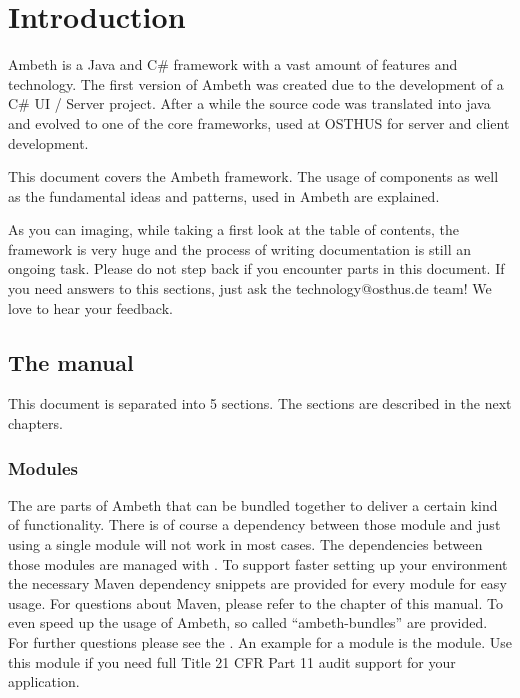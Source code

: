 \chapter{Introduction}
\label{Introduction}


Ambeth is a Java and C\# framework with a vast amount of features and technology. The first version of Ambeth was created due to the development
of a C\# UI / Server project. After a while the source code was translated into java and evolved to one of the core frameworks, used at OSTHUS\textsuperscript{\textregistered} for server and client development.

This document covers the Ambeth framework. The usage of components as well as the fundamental ideas and patterns, used in Ambeth are explained.

As you can imaging, while taking a first look at the table of contents, the framework is very huge and the process of writing documentation is still an ongoing task. Please do not step back if you encounter \TODO parts in this document. If you need answers to this sections, just ask the technology@osthus.de team! We love to hear your feedback.

\section{The manual}
This document is separated into 5 sections. The sections are described in the next chapters.
\subsection{Modules}

The  are parts of Ambeth that can be bundled together to deliver a certain kind of functionality. There is of course a dependency between those module and 
just using a single module will not work in most cases. The dependencies between those modules are managed with . To support faster setting up your environment the
necessary Maven dependency snippets are provided for every module for easy usage. For questions about Maven, please refer to the  chapter of this manual.
To even speed up the usage of Ambeth, so called ``ambeth-bundles'' are provided. For further questions please see the .
An example for a module is the  module. Use this module if you need full  Title 21 CFR Part 11 audit support for your application.

